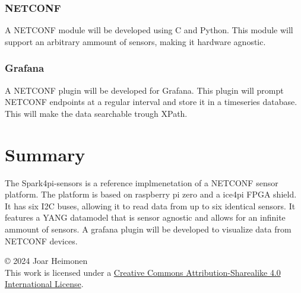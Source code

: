 \documentclass[12pt]{article}
\newcommand{\license}{
    \vspace{1em}
    \noindent\small{© 2024 Joar Heimonen\\
    This work is licensed under a \href{https://creativecommons.org/licenses/by-sa/4.0/}{Creative Commons Attribution-Sharealike 4.0 International License}.}
}
\begin{document}
\subsubsection{NETCONF}
A NETCONF module will be developed using C and Python. This module will support an arbitrary ammount of sensors,
making it hardware agnostic.

\subsubsection{Grafana}
A NETCONF plugin will be developed for Grafana. 
This plugin will prompt NETCONF endpoints at a regular interval and store it in a timeseries database.
This will make the data searchable trough XPath.

\section{Summary}
The Spark4pi-sensors is a reference implmenetation of a NETCONF sensor platform. 
The platform is based on raspberry pi zero and a ice4pi FPGA shield. It has six I2C buses, 
allowing it to read data from up to six identical sensors. It features a YANG datamodel that is sensor agnostic
and allows for an infinite ammount of sensors. A grafana plugin will be developed to visualize data from NETCONF devices.

\pagebreak
{}
\printbibliography
\license
\end{document}
